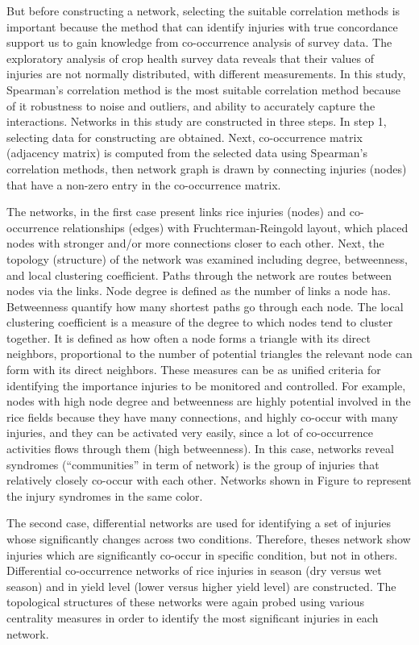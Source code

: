 But before constructing a network, selecting the suitable correlation methods is important because the method that can identify injuries with true concordance support us to gain knowledge from co-occurrence analysis of survey data. The exploratory analysis of crop health survey data reveals that their values of injuries are not normally distributed, with different measurements. In this study, Spearman’s correlation method is the most suitable correlation method because of it robustness to noise and outliers, and ability to accurately capture the interactions. Networks in this study are constructed in three steps. In step 1, selecting data for constructing are obtained. Next, co-occurrence matrix (adjacency matrix) is computed from the selected data using Spearman’s correlation methods, then network graph is drawn by connecting injuries (nodes) that have a non-zero entry in the co-occurrence matrix.

The networks, in the first case present links rice injuries (nodes) and co-occurrence relationships (edges) with Fruchterman-Reingold layout, which placed nodes with stronger and/or more connections closer to each other. Next, the topology (structure) of the network was examined including degree, betweenness, and local clustering coefficient. Paths through the network are routes between nodes via the links. Node degree is defined as the number of links a node has. Betweenness quantify how many shortest paths go through each node. The local clustering coefficient is a measure of the degree to which nodes tend to cluster together. It is defined as how often a node forms a triangle with its direct neighbors, proportional to the number of potential triangles the relevant node can form with its direct neighbors. These measures can be as unified criteria for identifying the importance injuries to be monitored and controlled. For example, nodes with high node degree and betweenness are highly potential involved in the rice fields because they have many connections, and highly co-occur with many injuries, and they can be activated very easily, since a lot of co-occurrence activities flows through them (high betweenness). In this case, networks reveal syndromes (“communities” in term of network) is the group of injuries that relatively closely co-occur with each other. Networks shown in Figure to represent the injury syndromes in the same color.

The second case, differential networks are used for identifying a set of injuries whose significantly changes across two conditions. Therefore, theses network show injuries which are significantly co-occur in specific condition, but not in others. Differential co-occurrence networks of rice injuries in season (dry versus wet season) and in yield level (lower versus higher yield level) are constructed. The topological structures of these networks were again probed using various centrality measures in order to identify the most significant injuries in each network.


